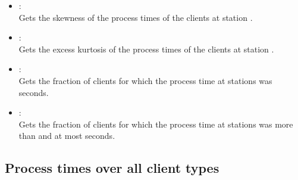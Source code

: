 \begin{itemize}
\item
{}:\\
Gets the skewness of the process times of the clients at station .

\item
{}:\\
Gets the excess kurtosis of the process times of the clients at station .

\item
{}:\\
Gets the fraction of clients for which the process time at stations  was  seconds.

\item
{}:\\
Gets the fraction of clients for which the process time at stations  was more than  and at most  seconds.

\end{itemize}



\subsection{Process times over all client types}

